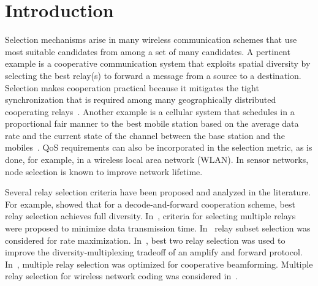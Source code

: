 \documentclass[12pt,draftcls,peerreview, onecolumn]{IEEEtran}
\begin{document}
\IEEEpeerreviewmaketitle

\section{Introduction}

Selection mechanisms arise in many wireless communication schemes that
use most suitable candidates from among a set of many candidates. A
pertinent example is a cooperative communication system that exploits
spatial diversity by selecting the best relay(s) to forward a message
from a source to a destination. Selection makes cooperation practical
because it mitigates the tight synchronization that is required
among many geographically distributed cooperating
relays~\cite{bletsas_jsac_2006,lin_Globecom_2005,nam_CISS_2008,yang_VT_2008,luo_VTC_2005,yang_CISS_2006,madan_TWC_2008,beres_TWC_2008,michalopoulos_2008_TWC,lo_VT_2009_SubsetSelection,lo_VT_2009_HARQ}.
Another example is a cellular system that schedules in a 
proportional fair manner to the best mobile station based on 
the average data rate and the
current state of the channel between the base station and the
mobiles~\cite{tse_2005}. QoS requirements can also be incorporated in
the selection metric, as is done, for example, in a wireless local
area network (WLAN). In sensor networks, node selection is known to
improve network lifetime.

Several relay selection criteria have been proposed and analyzed in
the literature.  For example, \cite{bletsas_jsac_2006} showed that for
a decode-and-forward cooperation scheme, best relay selection achieves
full diversity.  In~\cite{nam_CISS_2008}, criteria for selecting
multiple relays were proposed to minimize data transmission time.
In~\cite{lo_VT_2009_SubsetSelection} relay subset selection was
considered for rate maximization.  In~\cite{yang_CISS_2006}, best two
relay selection was used to improve the diversity-multiplexing
tradeoff of an amplify and forward protocol.
In~\cite{madan_TWC_2008}, multiple relay selection was optimized for
cooperative beamforming. Multiple relay selection for wireless network
coding was considered in~\cite{ding_TWC_2009}.
\end{document}
